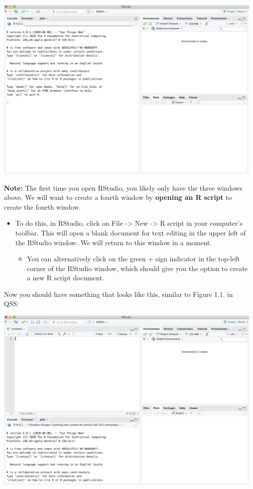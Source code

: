 \documentclass[
  letterpaper,
  DIV=11,
  numbers=noendperiod]{scrreprt}
\providecommand{\tightlist}{%
  \setlength{\itemsep}{0pt}\setlength{\parskip}{0pt}}\usepackage{longtable,booktabs,array}
\begin{document}
\includegraphics{images/rconsole1.png}

\textbf{Note:} The first time you open RStudio, you likely only have the
three windows above. We will want to create a fourth window by
\textbf{opening an R script} to create the fourth window.

\begin{itemize}
\tightlist
\item
  To do this, in RStudio, click on File -\textgreater{} New
  -\textgreater{} R script in your computer's toolbar. This will open a
  blank document for text editing in the upper left of the RStudio
  window. We will return to this window in a moment.

  \begin{itemize}
  \tightlist
  \item
    You can alternatively click on the green + sign indicator in the
    top-left corner of the RStudio window, which should give you the
    option to create a new R script document.
  \end{itemize}
\end{itemize}

Now you should have something that looks like this, similar to Figure
1.1. in QSS:

\includegraphics{images/rconsole2.png}
\end{document}
